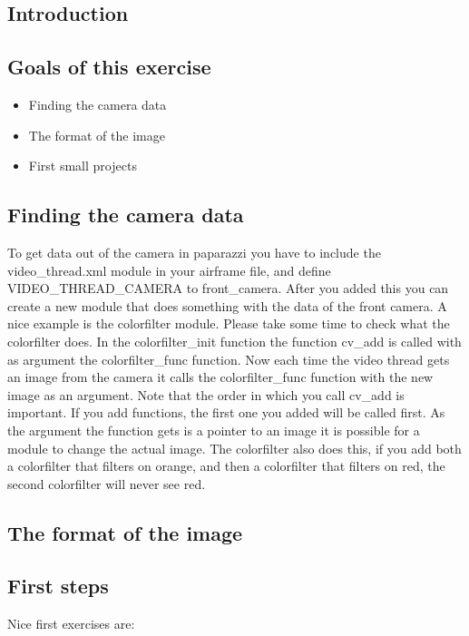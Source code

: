 \documentclass{article}
\begin{document}

\subsection*{Introduction}


\subsection*{Goals of this exercise}
\begin{itemize}
\item Finding the camera data
\item The format of the image
\item First small projects
\end{itemize}

\subsection*{Finding the camera data}
To get data out of the camera in paparazzi you have to include the video\_thread.xml module in your airframe file, and define VIDEO\_THREAD\_CAMERA to front\_camera.
After you added this you can create a new module that does something with the data of the front camera. A nice example is the colorfilter module. Please take some time to check what the colorfilter does. 
In the colorfilter\_init function the function cv\_add is called with as argument the colorfilter\_func function. 
Now each time the video thread gets an image from the camera it calls the colorfilter\_func function with the new image as an argument. Note that the order in which you call cv\_add is important. If you add functions, the first one you added will be called first. As the argument the function gets is a pointer to an image it is possible for a module to change the actual image. The colorfilter also does this, if you add both a colorfilter that filters on orange, and then a colorfilter that filters on red, the second colorfilter will never see red. 

\subsection*{The format of the image}

\subsection*{First steps}
Nice first exercises are:
\end{document}
